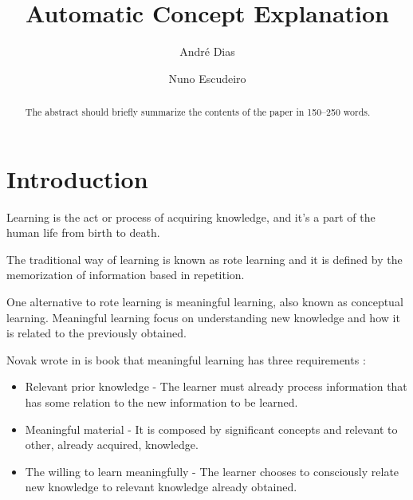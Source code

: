 \documentclass[runningheads]{llncs}
\begin{document}
%
\title{Automatic Concept Explanation}
%
%
\author{André Dias \and
Nuno Escudeiro}
%
%
%
\maketitle              %
%
\begin{abstract}
The abstract should briefly summarize the contents of the paper in
150--250 words.

\end{abstract}
%
%
%
\section{Introduction}

Learning is the act or process of acquiring knowledge, and it's a part of the human life from birth to death.

The traditional way of learning is known as rote learning and it is defined by the memorization of information based in repetition.

One alternative to rote learning is meaningful learning, also known as conceptual learning.
Meaningful learning focus on understanding new knowledge and how it is related to the previously obtained.

Novak \cite{novak_2012} wrote in is book that meaningful learning has three requirements :

\begin{itemize}
    \item Relevant prior knowledge - The learner must already process information that has some relation to the new information to be learned.
    \item Meaningful material - It is composed by significant concepts and relevant to other, already acquired, knowledge.
    \item The willing to learn meaningfully - The learner chooses to consciously relate new knowledge to relevant knowledge already obtained.
\end{itemize}
\end{document}

